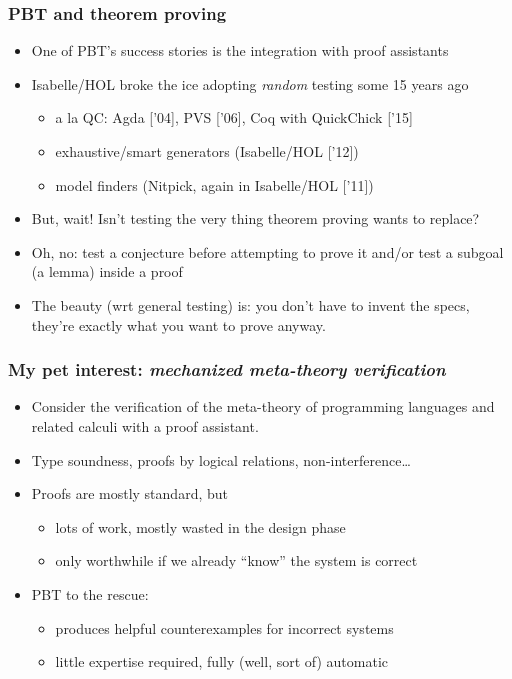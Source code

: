 \documentclass{beamer}
\newcommand{\red}[1]{{\color{red} #1}}
\begin{document}
\begin{frame}
  \frametitle{PBT and theorem proving}
  \begin{itemize}
  \item One of PBT's success stories is the integration with proof assistants
  \pause
  \item Isabelle/HOL broke the ice adopting
    \emph{random} testing some 15 years ago %
    \begin{itemize}
    \item  a la QC: Agda ['04], PVS ['06], Coq
    with QuickChick ['15]
  \item exhaustive/smart generators (Isabelle/HOL ['12])
  \item model finders (Nitpick, again in Isabelle/HOL ['11])
  \end{itemize}
\item But, wait! Isn't testing the very thing theorem proving wants to replace?
  \pause 
\item Oh, no: test a conjecture before attempting to prove it and/or
  test a subgoal (a lemma) inside a proof
\item The beauty (wrt general testing) is: you don't
  have to invent the specs, they're exactly what you want to prove
  anyway.
  \end{itemize}
\end{frame}
\begin{frame}\frametitle{My pet interest: \emph{mechanized
    meta-theory verification}}
\begin{itemize}
\item Consider the verification of the meta-theory of programming languages and related calculi with a proof assistant.
\item  Type soundness, proofs by logical relations, non-interference\dots
\item Proofs are mostly standard, but
  \begin{itemize}
  \item lots of work, mostly wasted in the
  \red{design} phase
\item only worthwhile
  if \red{we already ``know'' the system is correct}
\end{itemize}

\pause
\item PBT to the rescue:
\begin{itemize}
  \item produces helpful counterexamples for incorrect systems
  \item little expertise required, fully (well, sort of) automatic
\end{itemize}
  \end{itemize}
\end{frame}
\end{document}
